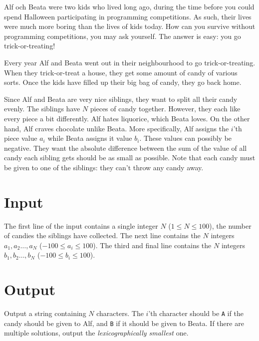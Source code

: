 
\noindent
Alf och Beata were two kids who lived long ago, during the time before you could spend Halloween participating in programming competitions.
As such, their lives were much more boring than the lives of kids today.
How can you survive without programming competitions, you may ask yourself.
The answer is easy: you go trick-or-treating!

Every year Alf and Beata went out in their neighbourhood to go trick-or-treating.
When they trick-or-treat a house, they get some amount of candy of various sorts.
Once the kids have filled up their big bag of candy, they go back home.

Since Alf and Beata are very nice siblings, they want to split all their candy evenly.
The siblings have $N$ pieces of candy together.
However, they each like every piece a bit differently.
Alf hates liquorice, which Beata loves.
On the other hand, Alf craves chocolate unlike Beata.
More specifically, Alf assigns the $i$'th piece value $a_i$ while Beata assigns it value $b_i$.
These values can possibly be negative.
They want the absolute difference between the sum of the value of all candy each sibling gets should be as small as possible.
Note that each candy must be given to one of the siblings: they can't throw any candy away.

\section*{Input}
The first line of the input contains a single integer $N$ ($1 \le N \le 100$), the number of candies the siblings have collected.
The next line contains the $N$ integers $a_1, a_2 \dots, a_N$ ($-100 \le a_i \le 100$).
The third and final line contains the $N$ integers $b_1, b_2 \dots, b_N$ ($-100 \le b_i \le 100$).

\section*{Output}
Output a string containing $N$ characters.
The $i$'th character should be \texttt{A} if the candy should be given to Alf, and \texttt{B} if it should be given to Beata.
If there are multiple solutions, output the \emph{lexicographically smallest} one.
